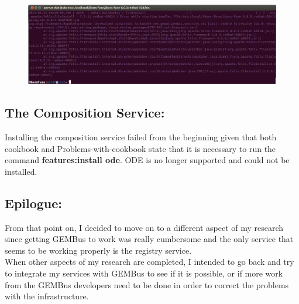 \documentclass[12 pt, twoside]{article}
\begin{document}
{{			\begin{figure}[!ht]
				\centering
				\includegraphics[width = 6.5 in]{Log_report}
			\end{figure}
		}
		
		\subsection{The Composition Service:}
		{
			Installing the composition service failed from the beginning given that both cookbook and Problems-with-cookbook state that it is necessary to run the command \textbf{features:install ode}. ODE is no longer supported and could not be installed.
		}
		
		\subsection{Epilogue:}
		{
			From that point on, I decided to move on to a different aspect of my research since getting GEMBus to work was really cumbersome and the only service that seems to be working properly is the registry service. \\
			
			When other aspects of my research are completed, I intended to go back and try to integrate my services with GEMBus to see if it is possible, or if more work from the GEMBus developers need to be done in order to correct the problems with the infrastructure.			
		}
	}
\end{document}
